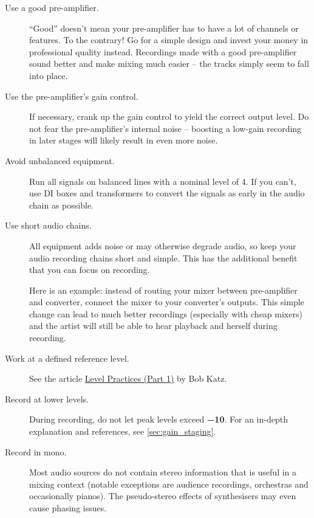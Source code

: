 \begin{description}

\item[Use a good pre-amplifier.]  ``Good'' doesn't mean your
  pre-amplifier has to have a lot of channels or features.  To the
  contrary!  Go for a simple design and invest your money in
  professional quality instead.  Recordings made with a good
  pre-amplifier sound better and make mixing much easier -- the tracks
  simply seem to fall into place.

\item[ Use the pre-amplifier's gain control.]  If necessary, crank up
  the gain control to yield the correct output level.  Do not fear the
  pre-amplifier's internal noise -- boosting a low-gain recording in
  later stages will likely result in even more noise.

\item[Avoid unbalanced equipment.]  Run all signals on balanced lines
  with a nominal level of \SI[retain-explicit-plus]{+4}{\dBu}.  If you
  can't, use DI boxes and transformers to convert the signals as early
  in the audio chain as possible.

\item[Use short audio chains.]  All equipment adds noise or may
  otherwise degrade audio, so keep your audio recording chains short
  and simple.  This has the additional benefit that you can focus on
  recording.

  Here is an example: instead of routing your mixer between
  pre-amplifier and converter, connect the mixer to your converter's
  outputs.  This simple change can lead to much better recordings
  (especially with cheap mixers) and the artist will still be able to
  hear playback and herself during recording.

\item[Work at a defined reference level.]  See the article
  \href{https://www.digido.com/portfolio-item/level-practices-part-1/}{Level
    Practices (Part 1)} by Bob Katz.

\item[Record at lower levels.]  During recording, do not let peak
  levels exceed \textbf{\SI{-10}{\dBFS}}.  For an in-depth explanation
  and references, see \ref{sec:gain_staging}.

\item[Record in mono.]  Most audio sources do not contain stereo
  information that is useful in a mixing context (notable exceptions
  are audience recordings, orchestras and occasionally pianos).  The
  pseudo-stereo effects of synthesisers may even cause phasing issues.


\end{description}
